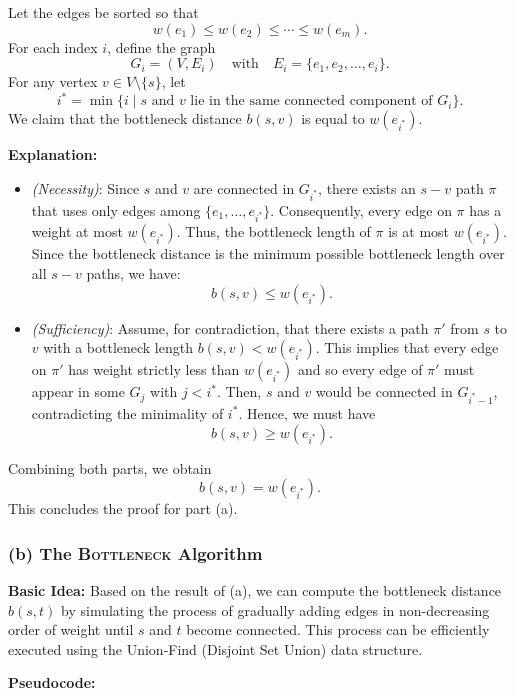 \documentclass[letterpaper, 11pt]{article}
\newcommand{\1}{\mathds{1}}	%
\theoremstyle{definition}
\newenvironment{solution}{{\par\noindent\it Solution.}}{}
\begin{document}
\begin{solution}
Let the edges be sorted so that 
\[
w(e_1) \le w(e_2) \le \cdots \le w(e_m).
\]
For each index \( i \), define the graph 
\[
G_i = (V, E_i) \quad \text{with} \quad E_i = \{e_1, e_2, \dots, e_i\}.
\]
For any vertex \( v \in V \setminus \{s\} \), let 
\[
i^* = \min \{ i \mid \text{\(s\) and \(v\) lie in the same connected component of } G_i \}.
\]
We claim that the bottleneck distance \( b(s,v) \) is equal to \( w(e_{i^*}) \).

\textbf{Explanation:}

\begin{itemize}
    \item \emph{(Necessity)}: Since \( s \) and \( v \) are connected in \( G_{i^*} \), there exists an \( s\!-\!v \) path \(\pi\) that uses only edges among \( \{e_1, \dots, e_{i^*}\} \). Consequently, every edge on \(\pi\) has a weight at most \( w(e_{i^*}) \). Thus, the bottleneck length of \(\pi\) is at most \( w(e_{i^*}) \). Since the bottleneck distance is the minimum possible bottleneck length over all \( s\!-\!v \) paths, we have:
    \[
    b(s,v) \le w(e_{i^*}).
    \]
    \item \emph{(Sufficiency)}: Assume, for contradiction, that there exists a path \(\pi'\) from \( s \) to \( v \) with a bottleneck length \( b(s,v) < w(e_{i^*}) \). This implies that every edge on \(\pi'\) has weight strictly less than \( w(e_{i^*}) \) and so every edge of \(\pi'\) must appear in some \( G_j \) with \( j < i^* \). Then, \( s \) and \( v \) would be connected in \( G_{i^*-1} \), contradicting the minimality of \( i^* \). Hence, we must have
    \[
    b(s,v) \ge w(e_{i^*}).
    \]
\end{itemize}

Combining both parts, we obtain
\[
b(s,v) = w(e_{i^*}).
\]
This concludes the proof for part (a).

\subsubsection*{(b) The \textsc{Bottleneck} Algorithm}

\textbf{Basic Idea:}  
Based on the result of (a), we can compute the bottleneck distance \( b(s,t) \) by simulating the process of gradually adding edges in non-decreasing order of weight until \( s \) and \( t \) become connected. This process can be efficiently executed using the Union-Find (Disjoint Set Union) data structure.

\textbf{Pseudocode:}


\end{solution}
\end{document}
